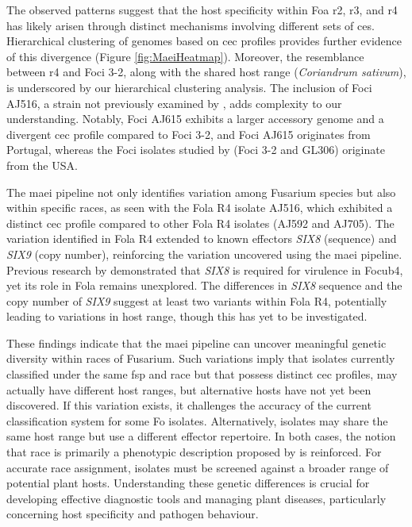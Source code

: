 The observed patterns suggest that the host specificity within \ac{Foa} \ac{r2}, \ac{r3}, and \ac{r4} has likely arisen through distinct mechanisms involving different sets of \acp{ce}. Hierarchical clustering of genomes based on \ac{cec} profiles provides further evidence of this divergence (Figure \ref{fig:MaeiHeatmap}). Moreover, the resemblance between \ac{r4} and \ac{Foci} 3-2, along with the shared host range (\textit{Coriandrum sativum}), is underscored by our hierarchical clustering analysis. The inclusion of \ac{Foci} AJ516, a strain not previously examined by \textcite{Henry2020, Epstein2022}, adds complexity to our understanding. Notably, \ac{Foci} AJ615 exhibits a larger accessory genome and a divergent \ac{cec} profile compared to \ac{Foci} 3-2, and \ac{Foci} AJ615 originates from Portugal, whereas the \ac{Foci} isolates studied by \textcite{Henry2020, Epstein2022} (\ac{Foci} 3-2 and GL306) originate from the USA. 

The \ac{maei} pipeline not only identifies variation among Fusarium species but also within specific races, as seen with the \ac{Fola} R4 isolate AJ516, which exhibited a distinct \ac{cec} profile compared to other \ac{Fola} R4 isolates (AJ592 and AJ705). The variation identified in \ac{Fola} R4 extended to known effectors \textit{SIX8} (sequence) and \textit{SIX9} (copy number), reinforcing the variation uncovered using the \ac{maei} pipeline. Previous research by \textcite{An2019} demonstrated that \textit{SIX8} is required for virulence in \ac{Focub4}, yet its role in \ac{Fola} remains unexplored. The differences in \textit{SIX8} sequence and the copy number of \textit{SIX9} suggest at least two variants within \ac{Fola} R4, potentially leading to variations in host range, though this has yet to be investigated.

These findings indicate that the \ac{maei} pipeline can uncover meaningful genetic diversity within races of Fusarium. Such variations imply that isolates currently classified under the same \ac{fsp} and race but that possess distinct \ac{cec} profiles, may actually have different host ranges, but alternative hosts have not yet been discovered. If this variation exists, it challenges the accuracy of the current classification system for some \ac{Fo} isolates. Alternatively, isolates may share the same host range but use a different effector repertoire. In both cases, the notion that race is primarily a phenotypic description proposed by \textcite{Torres2021} is reinforced. For accurate race assignment, isolates must be screened against a broader range of potential plant hosts. Understanding these genetic differences is crucial for developing effective diagnostic tools and managing plant diseases, particularly concerning host specificity and pathogen behaviour.

